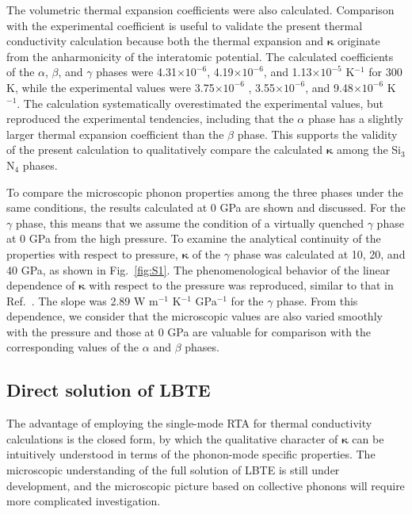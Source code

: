 \documentclass[twocolumn,amsmath,amssymb,a4paper,prb,superscriptaddress,floatfix]{revtex4-1}
\begin{document}
The volumetric thermal expansion coefficients were also calculated. 
Comparison with the experimental coefficient is useful to validate the present
thermal conductivity calculation because both the thermal expansion
and $\boldsymbol{\kappa}$ originate from the anharmonicity of the interatomic
potential.
The calculated coefficients of the $\alpha$, $\beta$, and $\gamma$ phases were
4.31$\times 10^{-6}$,  4.19$\times 10^{-6}$, and 1.13$\times 10^{-5}$
K$^{-1}$
for 300 K, while the experimental values\cite{minikayev-alpha, gamma-expand}
were 3.75$\times 10^{-6}$ , 3.55$\times 10^{-6}$, and 9.48$\times
10^{-6}$ K$^{-1}$. The calculation systematically overestimated the experimental
values, but reproduced the experimental tendencies, including that the $\alpha$
phase has a slightly larger thermal expansion coefficient than the $\beta$
phase. This supports the validity of the present calculation to qualitatively
compare the calculated $\boldsymbol{\kappa}$ among the Si$_3$N$_4$ phases.

To compare the microscopic phonon properties among the three phases under the
same conditions, the results calculated at 0 GPa are shown and discussed.  For
the $\gamma$ phase, this means that we assume the condition of a virtually
quenched $\gamma$ phase at 0 GPa from the high pressure. To examine the
analytical continuity of the properties with respect to pressure,
$\boldsymbol{\kappa}$ of the $\gamma$ phase was calculated at 10, 20, and 40
GPa, as shown in Fig.~\ref{fig:S1}. The phenomenological behavior of the linear
dependence of $\boldsymbol{\kappa}$ with respect to the pressure was reproduced,
similar to that in Ref.~. The slope was 2.89
W m$^{-1}$ K$^{-1}$ GPa$^{-1}$ for the $\gamma$ phase.  From this dependence, we
consider that the microscopic values are also varied smoothly with the pressure
and those at 0 GPa are valuable for comparison with the corresponding values of
the $\alpha$ and $\beta$ phases.

\subsection{Direct solution of LBTE}

The advantage of employing the single-mode RTA for thermal conductivity
calculations is the closed form, by which the qualitative character of
$\boldsymbol{\kappa}$ can be intuitively understood in terms of the phonon-mode
specific properties. The microscopic understanding of the full solution of LBTE
is still under development,\cite{cepellotti-relaxons} and the microscopic
picture based on collective phonons\cite{hardy-collective} will require more
complicated investigation.
\end{document}
